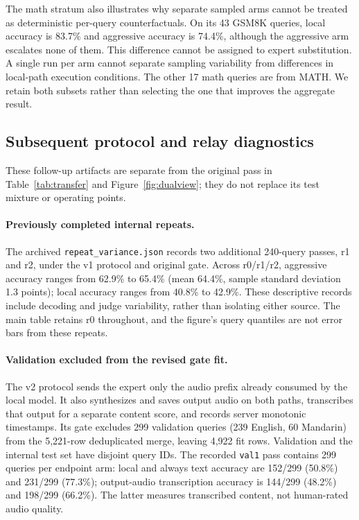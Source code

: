 The math stratum also illustrates why separate sampled arms cannot
be treated as deterministic per-query counterfactuals. On its 43
GSM8K queries, local accuracy is 83.7\% and aggressive accuracy is
74.4\%, although the aggressive arm escalates none of them. This
difference cannot be assigned to expert substitution. A single run
per arm cannot separate sampling variability from differences in
local-path execution conditions. The other
17 math queries are from MATH. We retain both subsets rather than
selecting the one that improves the aggregate result.

\subsection{Subsequent protocol and relay diagnostics}
\label{app:revision-diagnostics}
These follow-up artifacts are separate from the original pass in
Table~\ref{tab:transfer} and Figure~\ref{fig:dualview}; they do not
replace its test mixture or operating points.

\paragraph{Previously completed internal repeats.}
The archived \texttt{repeat\_variance.json} records two additional
240-query passes, r1 and r2, under the v1 protocol and original gate.
Across r0/r1/r2, aggressive accuracy ranges from 62.9\% to 65.4\%
(mean 64.4\%, sample standard deviation 1.3 points); local accuracy
ranges from 40.8\% to 42.9\%. These descriptive records include
decoding and judge variability, rather than isolating either source.
The main table retains r0 throughout, and the figure's query quantiles
are not error bars from these repeats.

\paragraph{Validation excluded from the revised gate fit.}
The v2 protocol sends the expert only the audio prefix already
consumed by the local model. It also synthesizes and saves output
audio on both paths, transcribes that output for a separate content
score, and records server monotonic timestamps. Its gate excludes
299 validation queries (239 English, 60 Mandarin) from the 5,221-row
deduplicated merge, leaving 4,922 fit rows. Validation and the internal
test set have disjoint query IDs. The recorded \texttt{val1} pass
contains 299 queries per endpoint arm: local and always text accuracy
are 152/299 (50.8\%) and 231/299 (77.3\%); output-audio transcription
accuracy is 144/299 (48.2\%) and 198/299 (66.2\%). The latter measures
transcribed content, not human-rated audio quality.

